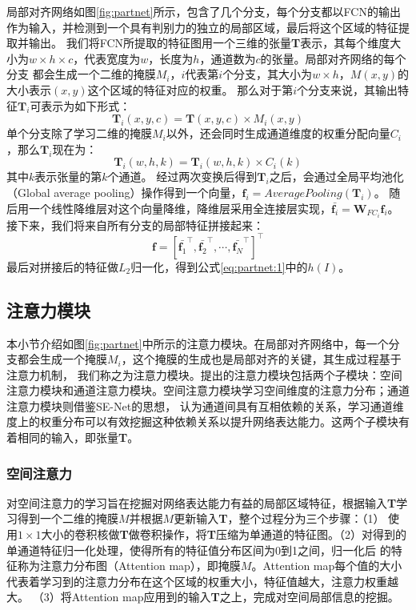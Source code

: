 局部对齐网络如图\ref{fig:partnet}所示，包含了几个分支，每个分支都以FCN的输出作为输入，并检测到一个具有判别力的独立的局部区域，最后将这个区域的特征提取并输出。
我们将FCN所提取的特征图用一个三维的张量\textbf{T}表示，其每个维度大小为$w\times h \times c$，代表宽度为$w$，长度为$h$，通道数为$c$的张量。局部对齐网络的每个分支
都会生成一个二维的掩膜$M_{i}$，$i$代表第$i$个分支，其大小为$w\times h$，$M(x,y)$的大小表示$(x,y)$这个区域的特征对应的权重。
那么对于第$i$个分支来说，其输出特征$\textbf{T}_{i}$可表示为如下形式：
\begin{equation}
\label{eq:partnet:3}
\textbf{T}_{i}(x,y,c)=\textbf{T}(x,y,c) \times M_{i}(x,y)
\end{equation}
单个分支除了学习二维的掩膜$M_{i}$以外，还会同时生成通道维度的权重分配向量$C_{i}$，那么$\textbf{T}_{i}$现在为：
\begin{equation}
\label{eq:partnet:4}
\textbf{T}_{i}(w,h,k)=\textbf{T}_{i}(w,h,k) \times C_{i}(k)
\end{equation}
其中$k$表示张量的第$k$个通道。
经过两次变换后得到$\textbf{T}_{i}$之后，会通过全局平均池化（Global average pooling）操作得到一个向量，$\textbf{f}_{i}=AveragePooling(\textbf{T}_{i})$。
随后用一个线性降维层对这个向量降维，降维层采用全连接层实现，$\bar{\textbf{f}_{i}}=\textbf{W}_{FC_{i}}\textbf{f}_{i}$。接下来，我们将来自所有分支的局部特征拼接起来：
\begin{equation}
\label{eq:partnet:5}
\textbf{f}=[\bar{\textbf{f}_{1}}^\top,\bar{\textbf{f}_{2}}^\top,\cdots,\bar{\textbf{f}_{N}}^\top]^\top
\end{equation}
最后对拼接后的特征做$L_{2}$归一化，得到公式\ref{eq:partnet:1}中的$h(I)$。

\subsection{注意力模块}
本小节介绍如图\ref{fig:partnet}中所示的注意力模块。在局部对齐网络中，每一个分支都会生成一个掩膜$M_{i}$，这个掩膜的生成也是局部对齐的关键，其生成过程基于注意力机制，
我们称之为注意力模块。提出的注意力模块包括两个子模块：空间注意力模块和通道注意力模块。空间注意力模块学习空间维度的注意力分布；通道注意力模块则借鉴SE-Net的思想，
认为通道间具有互相依赖的关系，学习通道维度上的权重分布可以有效挖掘这种依赖关系以提升网络表达能力。这两个子模块有着相同的输入，即张量\textbf{T}。
\subsubsection{空间注意力}
对空间注意力的学习旨在挖掘对网络表达能力有益的局部区域特征，根据输入\textbf{T}学习得到一个二维的掩膜$M$并根据$M$更新输入\textbf{T}，整个过程分为三个步骤：（1）
使用$1 \times 1$大小的卷积核做\textbf{T}做卷积操作，将\textbf{T}压缩为单通道的特征图。（2）对得到的单通道特征归一化处理，使得所有的特征值分布区间为0到1之间，归一化后
的特征称为注意力分布图（Attention map），即掩膜$M$。Attention map每个值的大小代表着学习到的注意力分布在这个区域的权重大小，特征值越大，注意力权重越大。
（3）将Attention map应用到的输入\textbf{T}之上，完成对空间局部信息的挖掘。

